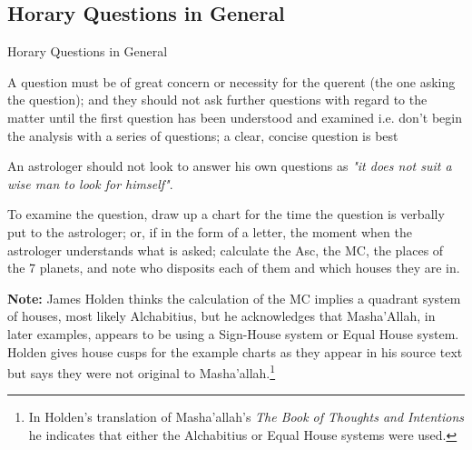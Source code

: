 \subsection{Horary Questions in General}
\begin{frame}[t]{Horary Questions in General}

A question must be of great concern or necessity for the querent (the one asking the question); and they should not ask further questions with regard to the matter until the first question has been understood and examined i.e. don't begin the analysis with a series of questions; a clear, concise question is best

An astrologer should not look to answer his own questions as \textsl{"it does not suit a wise man to look for himself"}. 

To examine the question, draw up a chart for the time the question is verbally put to the astrologer; or, if in the form of a letter, the moment when the astrologer understands what is asked; calculate the Asc, the MC, the places of the 7 planets, and note who disposits each of them and which houses they are in.
\vspace{0.25cm}
\begin{mdframed}[backgroundcolor=gray!5, rightmargin=2em, leftmargin=2em]
\small
\textbf{Note:} James Holden thinks the calculation of the MC implies a quadrant system of houses, most likely Alchabitius, but he acknowledges that Masha'Allah, in later examples, appears to be using a Sign-House system or Equal House system. Holden gives house cusps for the example charts as they appear in his source text but says they were not original to Masha'allah.\footnote{In Holden's translation of Masha'allah's \textsl{The Book of Thoughts and Intentions} he indicates that either the Alchabitius or Equal House systems were used.}
\end{mdframed}

\end{frame}